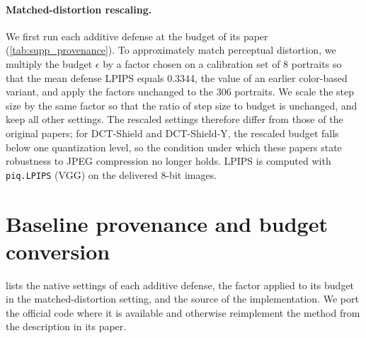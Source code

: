 \paragraph{Matched-distortion rescaling.} We first run each additive defense at the budget of its paper (\cref{tab:supp_provenance}). To approximately match perceptual distortion, we multiply the budget $\epsilon$ by a factor chosen on a calibration set of 8 portraits so that the mean defense LPIPS equals 0.3344, the value of an earlier color-based variant, and apply the factors unchanged to the 306 portraits. We scale the step size by the same factor so that the ratio of step size to budget is unchanged, and keep all other settings. The rescaled settings therefore differ from those of the original papers; for DCT-Shield and DCT-Shield-Y, the rescaled budget falls below one quantization level, so the condition under which these papers state robustness to JPEG compression no longer holds. LPIPS is computed with \texttt{piq.LPIPS} (VGG) on the delivered 8-bit images.

\section{Baseline provenance and budget conversion}
\label{sec:supp_provenance}
 lists the native settings of each additive defense, the factor applied to its budget in the matched-distortion setting, and the source of the implementation. We port the official code where it is available and otherwise reimplement the method from the description in its paper.

